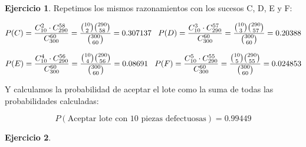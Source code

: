 \documentclass[a4paper, 12pt]{article}
\theoremstyle{definition}
\newtheorem{ej}{Ejercicio}
\begin{document}
\begin{ej}
Repetimos los mismos razonamientos con los sucesos C, D, E y F:

\[
    P(C) = \frac{C_{10}^{2} \cdot C_{290}^{58}}{C_{300}^{60}} = \frac{\binom{10}{2} \binom{290}{58}}{\binom{300}{60}} = 0.307137 \hspace{0.3cm}
    P(D) = \frac{C_{10}^{3} \cdot C_{290}^{57}}{C_{300}^{60}} = \frac{\binom{10}{3} \binom{290}{57}}{\binom{300}{60}} = 0.20388
\]

\[
    P(E) = \frac{C_{10}^{4} \cdot C_{290}^{56}}{C_{300}^{60}} = \frac{\binom{10}{4} \binom{290}{56}}{\binom{300}{60}} = 0.08691 \hspace{0.3cm}
    P(F) = \frac{C_{10}^{5} \cdot C_{290}^{55}}{C_{300}^{60}} = \frac{\binom{10}{5} \binom{290}{55}}{\binom{300}{60}} = 0.024853
\]

Y calculamos la probabilidad de aceptar el lote como la suma de todas las probabilidades calculadas:

\[
    P(\text{Aceptar lote con 10 piezas defectuosas}) = 0.99449
\]


\end{ej}

\begin{ej}
\end{ej}
\end{document}
